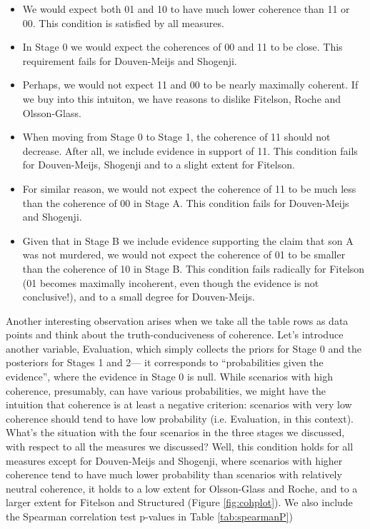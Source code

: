 \documentclass[10pt,]{scrartcl}
\begin{document}
\begin{itemize}
    \item We would expect both 01 and 10 to have much lower coherence than 11 or 00. This condition is satisfied by all measures.
    \item  In Stage 0 we would expect the coherences of 00 and 11 to be close. This requirement fails for Douven-Meijs and Shogenji.
    \item Perhaps, we would not expect 11 and 00 to be nearly maximally coherent. If we buy into this intuiton, we have reasons to dislike Fitelson, Roche and Olsson-Glass.
    \item When moving from Stage 0 to Stage 1, the coherence of 11 should not decrease. After all, we include evidence in support of 11. This condition fails for Douven-Meijs, Shogenji and to a slight extent for Fitelson.
    \item For similar reason, we would not expect the coherence of 11 to be much less than the coherence of 00 in Stage A. This condition fails for Douven-Meijs and Shogenji.
    \item Given that in Stage B we include evidence supporting the claim that son A was not murdered, we would not expect the coherence of 01 to be smaller than the coherence of 10 in Stage B. This condition fails radically for Fitelson (01 becomes maximally incoherent, even though the evidence is not conclusive!), and to a small degree for Douven-Meijs.
\end{itemize}


Another interesting observation arises when we take all the table rows as data points and think about the truth-conduciveness of coherence.  Let's introduce another variable, \textsf{Evaluation}, which simply collects the priors for Stage 0 and the posteriors for Stages 1 and 2--- it corresponds to ``probabilities given the evidence'', where the evidence in Stage 0 is null. While scenarios with high coherence, presumably, can have various probabilities, we might have the intuition that coherence is at least a negative criterion: scenarios with very low coherence should tend to have low probability (i.e. \textsf{Evaluation}, in this context). What's the situation with the four scenarios in the three stages we discussed, with respect to all the measures we discussed? Well, this condition holds for all measures except for Douven-Meijs and Shogenji, where scenarios with higher coherence tend to have much lower probability than scenarios with relatively neutral coherence, it holds to a low extent for Olsson-Glass and Roche, and to a larger extent for Fitelson and Structured  (Figure \ref{fig:cohplot}). We also include the Spearman correlation test p-values in Table \ref{tab:spearmanP})
\end{document}
